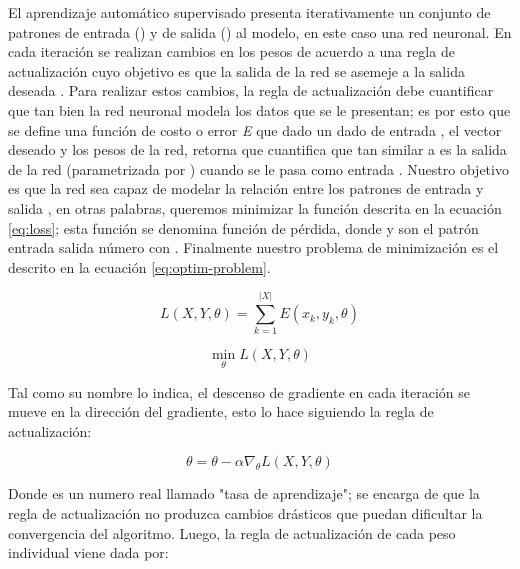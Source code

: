 El aprendizaje automático supervisado presenta iterativamente un conjunto de patrones de entrada () y de salida () al modelo, en este caso una red neuronal. En cada iteración se realizan cambios en los pesos \jim{\theta} de acuerdo a una regla de actualización cuyo objetivo es que la salida de la red se asemeje a la salida deseada \cite{Gurney1997}. Para realizar estos cambios, la regla de actualización debe cuantificar que tan bien la red neuronal modela los datos que se le presentan; es por esto que se define una función de costo o error \textit{E} que dado un dado de entrada , el vector deseado  y los pesos \jim{\theta} de la red, retorna  que cuantifica que tan similar a  es la salida de la red (parametrizada por \jim{\theta}) cuando se le pasa como entrada . Nuestro objetivo es que la red sea capaz de modelar la relación entre los patrones de entrada  y salida , en otras palabras, queremos minimizar la función descrita en la ecuación \ref{eq:loss}; esta función se denomina función de pérdida, donde  y  son el patrón entrada salida número  con . Finalmente nuestro problema de minimización es el descrito en la ecuación \ref{eq:optim-problem}.

\begin{equation}
    \label{eq:loss}
    L(X, Y, \theta) = \sum_{k = 1}^{|X|} E(x_k, y_k, \theta)
\end{equation}

\begin{equation}
    \label{eq:optim-problem}
    \min_{\theta} L(X, Y, \theta)
\end{equation}

Tal como su nombre lo indica, el descenso de gradiente en cada iteración se mueve en la dirección del gradiente, esto lo hace siguiendo la regla de actualización:

\begin{equation}
    \label{eq:gd-update-rule}
    \theta = \theta - \alpha \nabla_{\theta} L(X, Y, \theta)
\end{equation}

Donde  es un numero real llamado "tasa de aprendizaje"; \jim{\alpha} se encarga de que la regla de actualización no produzca cambios drásticos que puedan dificultar la convergencia del algoritmo. Luego, la regla de actualización de cada peso individual  viene dada por:


